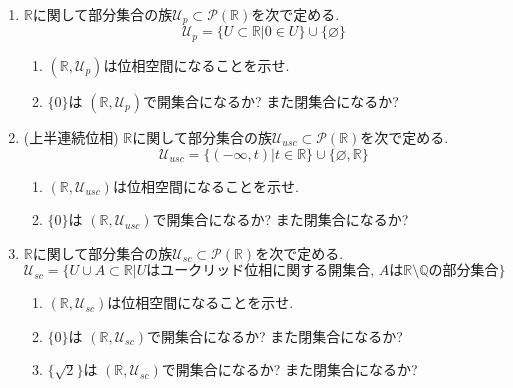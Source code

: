 \documentclass[dvipdfmx,a4paper,11pt]{article}
\newcommand{\R}{\mathbb{R}}
\newcommand{\Q}{\mathbb{Q}}
\theoremstyle{definition}
\begin{document}
\begin{enumerate}[label=\textbf{問}\ref*{sec-open}.\arabic*]
\item \label{point}$\R$に関して部分集合の族$\mathscr{U}_{p} \subset \mathcal{P}(\R)$を次で定める.
$$
\mathscr{U}_{p}  = \{U \subset \R | 0 \in U\}\cup \{  \varnothing  \}
$$
	\begin{enumerate}
	\setlength{\parskip}{0cm}
	\setlength{\itemsep}{0pt} 
	\item $(\R,\mathscr{U}_{p} )$は位相空間になることを示せ. 
	\item $\{ 0\}$は $(\R,\mathscr{U}_{p} )$で開集合になるか? また閉集合になるか?
	\end{enumerate}

\item \label{usc}(上半連続位相) $\R$に関して部分集合の族$\mathscr{U}_{usc} \subset \mathcal{P}(\R)$を次で定める.
$$
\mathscr{U}_{usc} = \{(- \infty,t) | t \in \R \} \cup \{  \varnothing , \R \}
$$
	\begin{enumerate}
	\setlength{\parskip}{0cm}
	\setlength{\itemsep}{0pt} 
	\item $(\R,\mathscr{U}_{usc})$は位相空間になることを示せ. 
	\item $\{ 0\}$は $(\R,\mathscr{U}_{usc})$で開集合になるか? また閉集合になるか?
	\end{enumerate}

		
\item \label{scat} $\R$に関して部分集合の族$\mathscr{U}_{sc} \subset \mathcal{P}(\R)$を次で定める.
$$
\mathscr{U}_{sc}  = \{U \cup A \subset \R | \text{$U$はユークリッド位相に関する開集合, $A$は$\R \setminus \Q$の部分集合}\}
$$
	\begin{enumerate}
	\setlength{\parskip}{0cm}
	\setlength{\itemsep}{0pt} 
	\item $(\R,\mathscr{U}_{sc} )$は位相空間になることを示せ. 
	\item $\{ 0\}$は $(\R,\mathscr{U}_{sc} )$で開集合になるか? また閉集合になるか?
	\item $\{ \sqrt{2}\}$は $(\R,\mathscr{U}_{sc} )$で開集合になるか? また閉集合になるか?
	\end{enumerate}
	

\end{enumerate}
\end{document}
